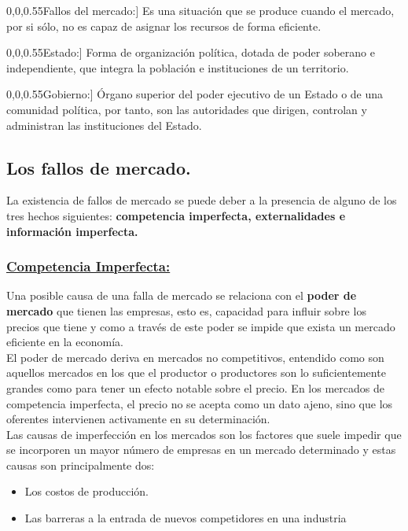 \begin{definicion}[\textcolor[rgb]{0,0,0.55}{Fallos del mercado:}]
{\small 	Es una situación que se produce cuando el mercado, por si sólo, no es capaz de asignar los recursos de forma eficiente.}
\end{definicion}

\begin{definicion}[\textcolor[rgb]{0,0,0.55}{Estado:}]
	{\small Forma de organización política, dotada de poder soberano e independiente, que integra la población e instituciones de un territorio.}
\end{definicion}

\begin{definicion}[\textcolor[rgb]{0,0,0.55}{Gobierno:}]
	{\small Órgano superior del poder ejecutivo de un Estado o de una comunidad política, por tanto, son las autoridades que dirigen, controlan y administran las instituciones del Estado.}
\end{definicion}

\subsection{{\large Los fallos de mercado.}}
La existencia de fallos de mercado se puede deber a la presencia de alguno de los tres hechos siguientes: \textbf{competencia imperfecta, externalidades e información imperfecta.}\\

\subsubsection{\textcolor[rgb]{0,0,0.55}{\underline{{\normalsize Competencia Imperfecta:}}}}
Una posible causa de una falla de mercado se relaciona con el \textbf{poder de mercado} que tienen las empresas, esto es,
capacidad para influir sobre los precios que tiene y como a través de este poder se impide que exista un mercado eficiente en la economía.\\

El poder de mercado deriva en mercados no competitivos, entendido como son aquellos mercados en los que el productor o productores son lo suficientemente grandes como para tener un efecto notable sobre el precio. En los mercados de competencia imperfecta, el precio no se acepta como un dato ajeno, sino que los oferentes intervienen activamente en su determinación.\\

Las causas de imperfección en los mercados son los factores que suele impedir que se incorporen un mayor número de empresas en un mercado determinado y estas causas son principalmente dos:
\begin{itemize}
	\item Los costos de producción.
	\item Las barreras a la entrada de nuevos competidores en una industria 
\end{itemize}

